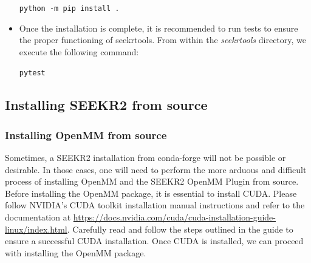 \documentclass[9pt,training,pubversion]{livecoms}
\newcommand{\cudatutoriallink}{\url{https://docs.nvidia.com/cuda/cuda-installation-guide-linux/index.html}}
\begin{document}
\begin{itemize}
\begin{tcolorbox}[colback=black!8!white, colframe=black!50!black, fontlower=\tiny, left=2pt, right=2pt, top=2pt, bottom=2pt] 
\texttt{python -m pip install .}
\end{tcolorbox}

\item Once the installation is complete, it is recommended to run tests to ensure the proper functioning of seekrtools. From within the \textit{seekrtools} directory, we execute the following command:

\begin{tcolorbox}[colback=black!8!white, colframe=black!50!black, fontlower=\tiny, left=2pt, right=2pt, top=2pt, bottom=2pt] 
\texttt{pytest}
\end{tcolorbox}

\end{itemize}

\subsection{Installing SEEKR2 from source}
\vspace{2mm}

\subsubsection{Installing OpenMM from source} \label{openmm_installation_source}
\vspace{2mm}

\noindent Sometimes, a SEEKR2 installation from conda-forge will not be possible or desirable. In those cases, one will need to perform the more arduous and difficult process of installing OpenMM and the SEEKR2 OpenMM Plugin from source. Before installing the OpenMM package, it is essential to install CUDA. Please follow NVIDIA's CUDA toolkit installation manual instructions and refer to the documentation at \cudatutoriallink. Carefully read and follow the steps outlined in the guide to ensure a successful CUDA installation. Once CUDA is installed, we can proceed with installing the OpenMM package. \par
\end{document}
